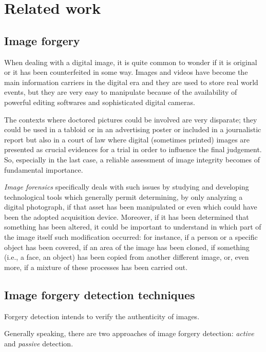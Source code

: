 \chapter{Related work}

\section{Image forgery}

When dealing with a digital image, it is quite common to wonder if it is original or it has been counterfeited in some way. Images and videos have become the main information carriers in the digital era and they are used to store real world events, but they are very easy to manipulate because of the availability of powerful editing softwares and sophisticated digital cameras.

The contexts where doctored pictures could be involved are very disparate; they could be used in a tabloid or in an advertising poster or included in a journalistic report but also in a court of law where digital (sometimes printed) images are presented as crucial evidences for a trial in order to influence the final judgement. So, especially in the last case, a reliable assessment of image integrity becomes of fundamental importance\cite{zhu2004seeing}\cite{farid2009digital}.

\emph{Image forensics} specifically deals with such issues by studying and developing technological tools which generally permit determining, by only analyzing a digital photograph, if that asset has been manipulated or even which could have been the adopted acquisition device\cite{farid2009image}. Moreover, if it has been determined that something has been altered, it could be important to understand in which part of the image itself such modification occurred: for instance, if a person or a specific object has been covered, if an area of the image has been cloned, if something (i.e., a face, an object) has been copied from another different image, or, even more, if a mixture of these processes has been carried out. 

\section{Image forgery detection techniques}

Forgery detection intends to verify the authenticity of images. 

Generally speaking, there are two approaches of image forgery detection: \emph{active} and \emph{passive} detection. 

